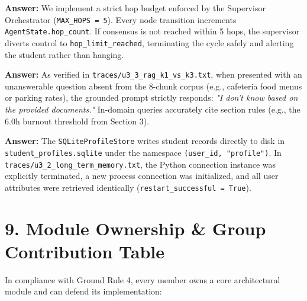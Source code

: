 \documentclass[10pt,a4paper]{article}
\begin{document}
\vspace{-2pt}
\begin{tcolorbox}[basebox, colframe=primary, colback=lightbg, title={\textbf{\color{primary} Q2: How do you prevent infinite negotiation loops between the Diagnostician and Negotiator?}}]
\footnotesize
\textbf{Answer:} We implement a strict hop budget enforced by the Supervisor Orchestrator (\texttt{MAX\_HOPS = 5}). Every node transition increments \texttt{AgentState.hop\_count}. If consensus is not reached within 5 hops, the supervisor diverts control to \texttt{hop\_limit\_reached}, terminating the cycle safely and alerting the student rather than hanging.
\end{tcolorbox}

\vspace{-2pt}
\begin{tcolorbox}[basebox, colframe=primary, colback=lightbg, title={\textbf{\color{primary} Q3: How do you prove Chroma RAG is grounded and does not hallucinate?}}]
\footnotesize
\textbf{Answer:} As verified in \texttt{traces/u3\_3\_rag\_k1\_vs\_k3.txt}, when presented with an unanswerable question absent from the 8-chunk corpus (e.g., cafeteria food menus or parking rates), the grounded prompt strictly responds: \textit{"I don't know based on the provided documents."} In-domain queries accurately cite section rules (e.g., the 6.0h burnout threshold from Section 3).
\end{tcolorbox}

\vspace{-2pt}
\begin{tcolorbox}[basebox, colframe=primary, colback=lightbg, title={\textbf{\color{primary} Q4: How does long-term memory survive process restarts?}}]
\footnotesize
\textbf{Answer:} The \texttt{SQLiteProfileStore} writes student records directly to disk in \texttt{student\_profiles.sqlite} under the namespace \texttt{(user\_id, "profile")}. In \texttt{traces/u3\_2\_long\_term\_memory.txt}, the Python connection instance was explicitly terminated, a new process connection was initialized, and all user attributes were retrieved identically (\texttt{restart\_successful = True}).
\end{tcolorbox}

\vspace{1pt}
\section*{\large \color{primary} 9. Module Ownership \& Group Contribution Table}
\vspace{-2pt}
In compliance with Ground Rule 4, every member owns a core architectural module and can defend its implementation:
\end{document}
